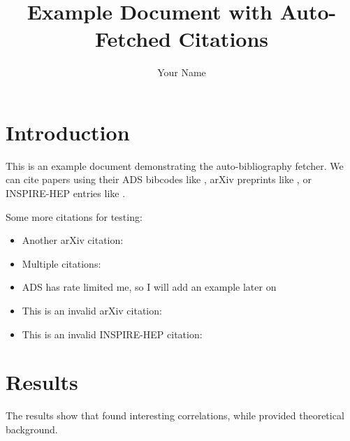 \documentclass{article}
\title{Example Document with Auto-Fetched Citations}
\author{Your Name}
\begin{document}
\maketitle

\section{Introduction}

This is an example document demonstrating the auto-bibliography fetcher.
We can cite papers using their ADS bibcodes like \cite{Cheng:2025fdu},
arXiv preprints like \cite{arXiv:2103.12345}, or INSPIRE-HEP entries
like \cite{Weinberg:1967tq}.

Some more citations for testing:
\begin{itemize}
    \item Another arXiv citation: \cite{2505.03934}
    \item Multiple citations: \cite{Cheng:2025fdu,Fabbri:2025cfg}
    \item ADS has rate limited me, so I will add an example later on
    \item This is an invalid arXiv citation: \cite{arXiv:3103.12345}
    \item This is an invalid INSPIRE-HEP citation: \cite{ADS:2025et}
\end{itemize}

\section{Results}

The results show that \citet{arXiv:2103.12345} found interesting
correlations, while \citep{arXiv:2103.12345} provided theoretical
background.

\printbibliography
\end{document}
